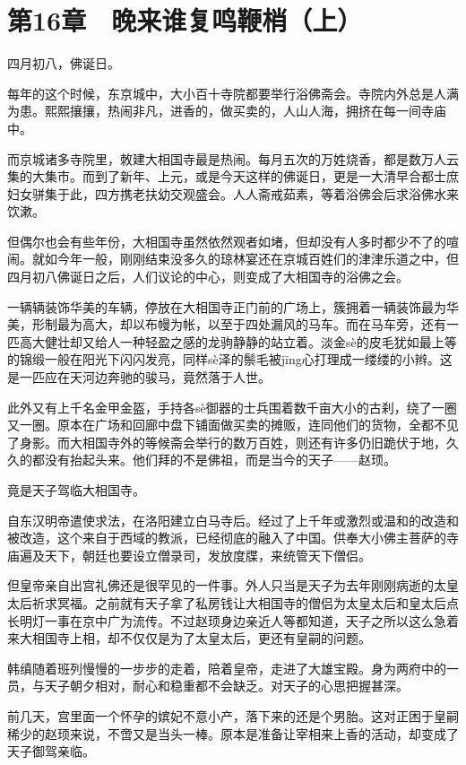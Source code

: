 \section{第16章　晚来谁复鸣鞭梢（上）}

四月初八，佛诞日。

每年的这个时候，东京城中，大小百十寺院都要举行浴佛斋会。寺院内外总是人满为患。熙熙攘攘，热闹非凡，进香的，做买卖的，人山人海，拥挤在每一间寺庙中。

而京城诸多寺院里，敇建大相国寺最是热闹。每月五次的万姓烧香，都是数万人云集的大集市。而到了新年、上元，或是今天这样的佛诞日，更是一大清早合都士庶妇女骈集于此，四方携老扶幼交观盛会。人人斋戒茹素，等着浴佛会后求浴佛水来饮漱。

但偶尔也会有些年份，大相国寺虽然依然观者如堵，但却没有人多时都少不了的喧闹。就如今年一般，刚刚结束没多久的琼林宴还在京城百姓们的津津乐道之中，但四月初八佛诞日之后，人们议论的中心，则变成了大相国寺的浴佛之会。

一辆辆装饰华美的车辆，停放在大相国寺正门前的广场上，簇拥着一辆装饰最为华美，形制最为高大，却以布幔为帐，以至于四处漏风的马车。而在马车旁，还有一匹高大健壮却又给人一种轻盈之感的龙驹静静的站立着。淡金sè的皮毛犹如最上等的锦缎一般在阳光下闪闪发亮，同样sè泽的鬃毛被jīng心打理成一缕缕的小辫。这是一匹应在天河边奔驰的骏马，竟然落于人世。

此外又有上千名金甲金盔，手持各sè御器的士兵围着数千亩大小的古刹，绕了一圈又一圈。原本在广场和回廊中盘下铺面做买卖的摊贩，连同他们的货物，全都不见了身影。而大相国寺外的等候斋会举行的数万百姓，则还有许多仍旧跪伏于地，久久的都没有抬起头来。他们拜的不是佛祖，而是当今的天子——赵顼。

竟是天子驾临大相国寺。

自东汉明帝遣使求法，在洛阳建立白马寺后。经过了上千年或激烈或温和的改造和被改造，这个来自于西域的教派，已经彻底的融入了中国。供奉大小佛主菩萨的寺庙遍及天下，朝廷也要设立僧录司，发放度牒，来统管天下僧侣。

但皇帝亲自出宫礼佛还是很罕见的一件事。外人只当是天子为去年刚刚病逝的太皇太后祈求冥福。之前就有天子拿了私房钱让大相国寺的僧侣为太皇太后和皇太后点长明灯一事在京中广为流传。不过赵顼身边亲近人等都知道，天子之所以这么急着来大相国寺上相，却不仅仅是为了太皇太后，更还有皇嗣的问题。

韩缜随着班列慢慢的一步步的走着，陪着皇帝，走进了大雄宝殿。身为两府中的一员，与天子朝夕相对，耐心和稳重都不会缺乏。对天子的心思把握甚深。

前几天，宫里面一个怀孕的嫔妃不意小产，落下来的还是个男胎。这对正困于皇嗣稀少的赵顼来说，不啻又是当头一棒。原本是准备让宰相来上香的活动，却变成了天子御驾亲临。

